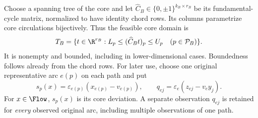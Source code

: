 Choose a spanning tree of the core and let
$\widehat C_B\in\{0,\pm1\}^{k_B\times r_B}$ be its fundamental-cycle
matrix, normalized to have identity chord rows. Its columns parametrize
core circulations bijectively. Thus the feasible core domain is
\begin{equation}\label{eq:core-domain}
 T_B=\{t\in\R^{r_B}:L_p\le(\widehat C_Bt)_p\le U_p
                         \quad(p\in\mathcal P_B)\}.
\end{equation}
It is nonempty and bounded, including in lower-dimensional cases. Boundedness
follows already from the chord rows. For later use, choose one original
representative arc $e(p)$ on each path and put
\begin{equation}\label{eq:aggregate-path-expression}
 s_p(x)=\varepsilon_{e(p)}(x_{e(p)}-v_{e(p)}),\qquad
 q_{ej}=\varepsilon_e(z_{ej}-v_e y_j).
\end{equation}
For $x\in\Flow$, $s_p(x)$ is its core deviation. A separate observation
$q_{ej}$ is retained for \emph{every} observed original arc, including
multiple observations of one path.

